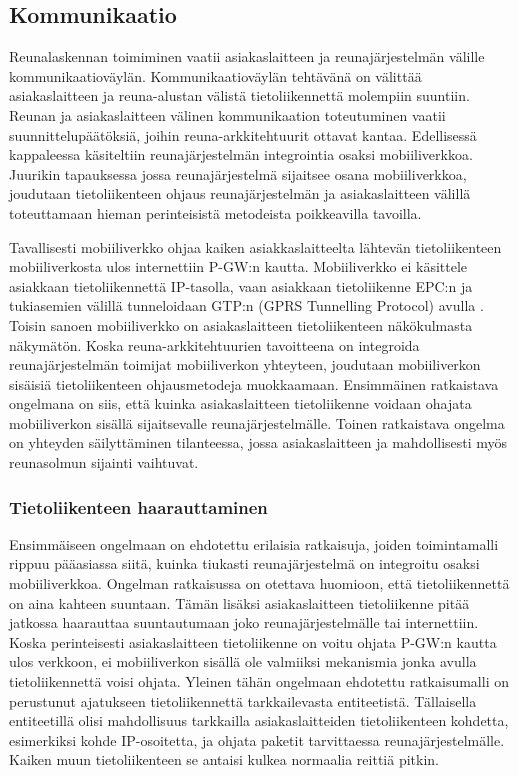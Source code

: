 \subsection{Kommunikaatio}
Reunalaskennan toimiminen vaatii asiakaslaitteen ja reunajärjestelmän välille kommunikaatioväylän.
Kommunikaatioväylän tehtävänä on välittää asiakaslaitteen ja reuna-alustan välistä tietoliikennettä molempiin suuntiin.
Reunan ja asiakaslaitteen välinen kommunikaation toteutuminen vaatii suunnittelupäätöksiä, joihin reuna-arkkitehtuurit ottavat kantaa. 
Edellisessä kappaleessa käsiteltiin reunajärjestelmän integrointia osaksi mobiiliverkkoa. Juurikin tapauksessa jossa reunajärjestelmä sijaitsee osana mobiiliverkkoa, joudutaan tietoliikenteen ohjaus reunajärjestelmän ja asiakaslaitteen välillä toteuttamaan hieman perinteisistä metodeista poikkeavilla tavoilla.

Tavallisesti mobiiliverkko ohjaa kaiken asiakkaslaitteelta lähtevän tietoliikenteen mobiiliverkosta ulos internettiin P-GW:n kautta. 
Mobiiliverkko ei käsittele asiakkaan tietoliikennettä IP-tasolla, vaan asiakkaan tietoliikenne EPC:n ja tukiasemien välillä tunneloidaan GTP:n (GPRS Tunnelling Protocol) avulla \cite{puente15seamless}.
Toisin sanoen mobiiliverkko on asiakaslaitteen tietoliikenteen näkökulmasta näkymätön.
Koska reuna-arkkitehtuurien tavoitteena on integroida reunajärjestelmän toimijat mobiiliverkon yhteyteen, joudutaan mobiiliverkon sisäisiä tietoliikenteen ohjausmetodeja muokkaamaan.
Ensimmäinen ratkaistava ongelmana on siis, että kuinka asiakaslaitteen tietoliikenne voidaan ohajata mobiiliverkon sisällä sijaitsevalle reunajärjestelmälle.
Toinen ratkaistava ongelma on yhteyden säilyttäminen tilanteessa, jossa asiakaslaitteen ja mahdollisesti myös reunasolmun sijainti vaihtuvat.

\subsubsection*{Tietoliikenteen haarauttaminen}
Ensimmäiseen ongelmaan on ehdotettu erilaisia ratkaisuja, joiden toimintamalli rippuu pääasiassa siitä, kuinka tiukasti reunajärjestelmä on integroitu osaksi mobiiliverkkoa.
Ongelman ratkaisussa on otettava huomioon, että tietoliikennettä on aina kahteen suuntaan. Tämän lisäksi asiakaslaitteen tietoliikenne pitää jatkossa haarauttaa suuntautumaan joko reunajärjestelmälle tai internettiin. 
Koska perinteisesti asiakaslaitteen tietoliikenne on voitu ohjata P-GW:n kautta ulos verkkoon, ei mobiiliverkon sisällä ole valmiiksi mekanismia jonka avulla tietoliikennettä voisi ohjata.
Yleinen tähän ongelmaan ehdotettu ratkaisumalli on perustunut ajatukseen tietoliikennettä tarkkailevasta entiteetistä.
Tällaisella entiteetillä olisi mahdollisuus tarkkailla asiakaslaitteiden tietoliikenteen kohdetta, esimerkiksi kohde IP-osoitetta, ja ohjata paketit tarvittaessa reunajärjestelmälle.
Kaiken muun tietoliikenteen se antaisi kulkea normaalia reittiä pitkin.

